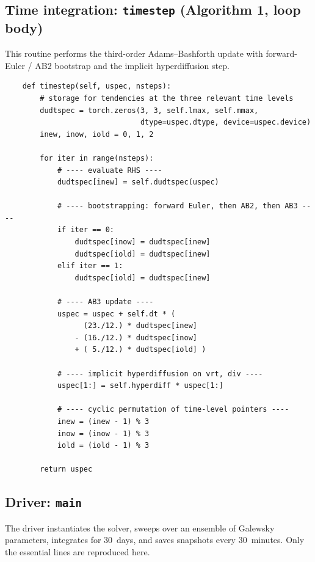 \documentclass[11pt]{article}
\begin{document}
\subsection{Time integration: \texttt{timestep} (Algorithm 1, loop body)}

This routine performs the third-order Adams--Bashforth update with
forward-Euler / AB2 bootstrap and the implicit hyperdiffusion step.

\begin{lstlisting}
    def timestep(self, uspec, nsteps):
        # storage for tendencies at the three relevant time levels
        dudtspec = torch.zeros(3, 3, self.lmax, self.mmax,
                               dtype=uspec.dtype, device=uspec.device)
        inew, inow, iold = 0, 1, 2

        for iter in range(nsteps):
            # ---- evaluate RHS ----
            dudtspec[inew] = self.dudtspec(uspec)

            # ---- bootstrapping: forward Euler, then AB2, then AB3 ----
            if iter == 0:
                dudtspec[inow] = dudtspec[inew]
                dudtspec[iold] = dudtspec[inew]
            elif iter == 1:
                dudtspec[iold] = dudtspec[inew]

            # ---- AB3 update ----
            uspec = uspec + self.dt * (
                  (23./12.) * dudtspec[inew]
                - (16./12.) * dudtspec[inow]
                + ( 5./12.) * dudtspec[iold] )

            # ---- implicit hyperdiffusion on vrt, div ----
            uspec[1:] = self.hyperdiff * uspec[1:]

            # ---- cyclic permutation of time-level pointers ----
            inew = (inew - 1) % 3
            inow = (inow - 1) % 3
            iold = (iold - 1) % 3

        return uspec
\end{lstlisting}

\subsection{Driver: \texttt{main}}

The driver instantiates the solver, sweeps over an ensemble of
Galewsky parameters, integrates for $30$~days, and saves snapshots
every $30$~minutes.  Only the essential lines are reproduced here.
\end{document}
